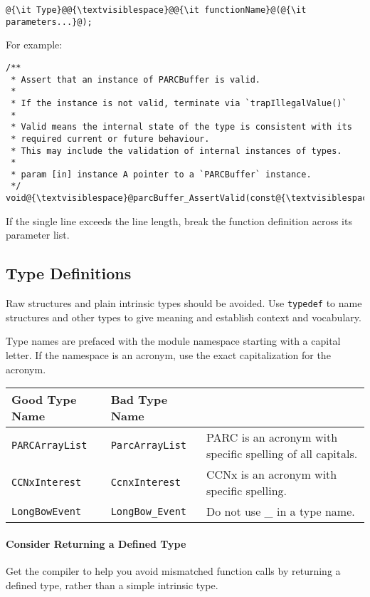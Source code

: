 \documentclass[fleqn,12pt]{PARCOneColumn} %
\begin{document}
\begin{lstlisting}
@{\it Type}@@{\textvisiblespace}@@{\it functionName}@(@{\it parameters...}@);
\end{lstlisting}

For example:

\begin{lstlisting}
/**
 * Assert that an instance of PARCBuffer is valid.
 *
 * If the instance is not valid, terminate via `trapIllegalValue()`
 *
 * Valid means the internal state of the type is consistent with its
 * required current or future behaviour.
 * This may include the validation of internal instances of types.
 *
 * param [in] instance A pointer to a `PARCBuffer` instance.
 */
void@{\textvisiblespace}@parcBuffer_AssertValid(const@{\textvisiblespace}@PARCBuffer@{\textvisiblespace}@*instance);    
\end{lstlisting}

If the single line exceeds the line length, break the function definition across its parameter list.
\subsection{Type Definitions}
Raw structures and plain intrinsic types should be avoided.
Use {\tt typedef} to name structures and other types to give meaning and establish context and vocabulary.

Type names are prefaced with the module namespace starting with a capital letter. If the namespace is an acronym, use the exact capitalization for the acronym.

\begin{tabular}{lll}
\toprule
Good Type Name & Bad Type Name & \\
\midrule
{\tt PARCArrayList} & {\tt ParcArrayList} & PARC is an acronym with specific spelling of all capitals.\\
{\tt CCNxInterest}  & {\tt CcnxInterest}  & CCNx is an acronym with specific spelling.\\
{\tt LongBowEvent}  & {\tt LongBow\_Event}& Do not use \_ in a type name. \\
\bottomrule
\end{tabular}

\paragraph{Consider Returning a Defined Type}
Get the compiler to help you avoid mismatched function calls by returning a defined type, rather than a simple intrinsic type.
\end{document}
